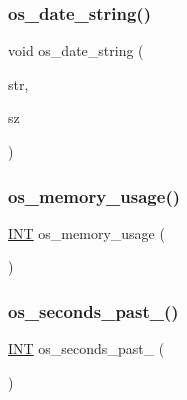 \subsubsection{\texorpdfstring{os\+\_\+date\+\_\+string()}{os\_date\_string()}}
{\footnotesize\ttfamily void os\+\_\+date\+\_\+string (\begin{DoxyParamCaption}\item[{\mbox{\hyperlink{galois_8h_ab6cc7b4aeb6ea31aba2b3fbfc83ff5e6}{B\+Y\+TE}} $\ast$}]{str,  }\item[{\mbox{\hyperlink{galois_8h_a09fddde158a3a20bd2dcadb609de11dc}{I\+NT}}}]{sz }\end{DoxyParamCaption})}

\mbox{\label{util_8_c_a5d6ab4b80c58e5d8bdb0fd1625709d0b}} 
\subsubsection{\texorpdfstring{os\+\_\+memory\+\_\+usage()}{os\_memory\_usage()}}
{\footnotesize\ttfamily \mbox{\hyperlink{galois_8h_a09fddde158a3a20bd2dcadb609de11dc}{I\+NT}} os\+\_\+memory\+\_\+usage (\begin{DoxyParamCaption}{ }\end{DoxyParamCaption})}

\mbox{\label{util_8_c_a43f9cdc7d266a857ddea7b92952494dc}} 
\subsubsection{\texorpdfstring{os\+\_\+seconds\+\_\+past\+\_()}{os\_seconds\_past\_1970()}}
{\footnotesize\ttfamily \mbox{\hyperlink{galois_8h_a09fddde158a3a20bd2dcadb609de11dc}{I\+NT}} os\+\_\+seconds\+\_\+past\+\_ (\begin{DoxyParamCaption}{ }\end{DoxyParamCaption})}

\mbox{\label{util_8_c_a3da6d2b09e35d569adb7101dffcb5224}} 
